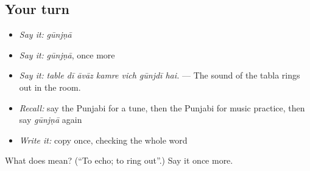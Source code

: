 \subsection*{Your turn}
\begin{itemize}
\raggedright
  \item \emph{Say it:} \emph{gūnjṇā}
  \item \emph{Say it:} \emph{gūnjṇā}, once more
  \item \emph{Say it:} \emph{table dī āvāz kamre vich gūnjdī hai.} — The sound of the tabla rings out in the room.
  \item \emph{Recall:} say the Punjabi for a tune, then the Punjabi for music practice, then say \emph{gūnjṇā} again
  \item \emph{Write it:} copy \textbf{} once, checking the whole word
\end{itemize}

\begin{tcolorbox}[breakable,colback=teal!4,colframe=teal!35!black,title={Before you move on}]
What does  mean? (\textquotedblleft{}To echo; to ring out\textquotedblright{}.) Say it once more.
\end{tcolorbox}
